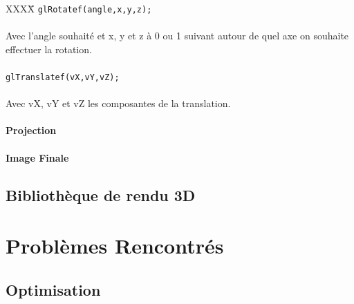\documentclass{report}
\begin{document}
\begin{tabbing}
XXXX\= \kill
\> \verb|glRotatef(angle,x,y,z);| \\\\
Avec l'angle souhaité et x, y et z à 0 ou 1 suivant autour de quel axe on souhaite\\ effectuer la rotation.\\\\
\> \verb|glTranslatef(vX,vY,vZ);|\\\\
Avec vX, vY et vZ les composantes de la translation. 
\end{tabbing}

\subsection{Projection}
\subsection{Image Finale}


\newpage

\chapter{Bibliothèque de rendu 3D}

\part{Problèmes Rencontrés}

\chapter{Optimisation}
\newpage
\end{document}
